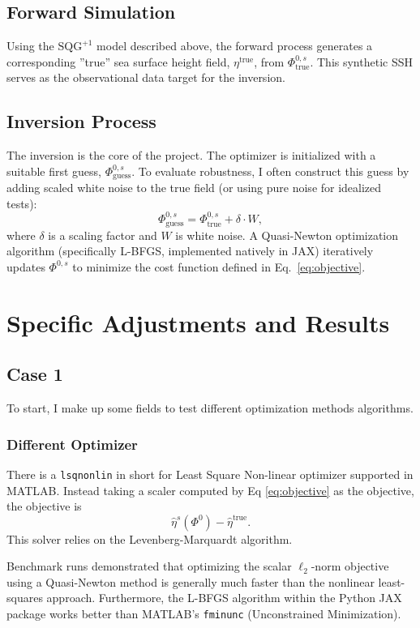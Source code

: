\documentclass[11pt]{article}
\newcommand{\<}{\langle}
\renewcommand{\>}{\rangle}
\begin{document}
    \subsection{Forward Simulation}
    Using the $\text{SQG}^{+1}$ model described above, the forward process generates a corresponding ''true'' sea surface height field, $\eta^{\text{true}}$, from $\Phi^{0,s}_{\text{true}}$. This synthetic SSH serves as the observational data target for the inversion.

    \subsection{Inversion Process}
    The inversion is the core of the project. The optimizer is initialized with a suitable first guess, $\Phi^{0,s}_{\text{guess}}$. To evaluate robustness, I often construct this guess by adding scaled white noise to the true field (or using pure noise for idealized tests):
    \[
        \Phi^{0,s}_{\text{guess}} = \Phi^{0,s}_{\text{true}} + \delta \cdot W,
    \]
    where $\delta$ is a scaling factor and $W$ is white noise. A Quasi-Newton optimization algorithm (specifically L-BFGS, implemented natively in JAX) iteratively updates $\Phi^{0,s}$ to minimize the cost function defined in Eq.\ \ref{eq:objective}.

    \section{Specific Adjustments and Results}
    \subsection{Case 1}
    To start, I make up some fields to test different optimization methods algorithms.
    \subsubsection{Different Optimizer}
    There is a \texttt{lsqnonlin} in short for Least Square Non-linear optimizer
    supported in MATLAB. Instead taking a scaler computed by Eq
    \ref{eq:objective} as the objective, the objective is
    \[
        \hat{\eta}^{s}(\Phi^{0}) - \hat{\eta}^{\text{true}}.
    \]
    This solver relies on the Levenberg-Marquardt algorithm.

    Benchmark runs demonstrated that optimizing the scalar $\ell_2$-norm objective using a Quasi-Newton method is generally much faster than the nonlinear least-squares approach. Furthermore, the L-BFGS algorithm within the Python JAX package works better than MATLAB's \texttt{fminunc} (Unconstrained Minimization).
\end{document}
